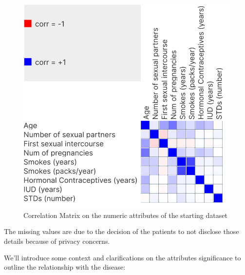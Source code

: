 \begin{figure}
    \centerline{
        \includegraphics[width=0.3\paperwidth]{figures/corr.png}}
    \caption{Correlation Matrix on the numeric attributes of the starting dataset}
    \label{correlation_matrix}
\end{figure}


The missing values are due to the decision of the patients to not disclose those details because of privacy concerns.

We'll introduce some context and clarifications on the attributes significance to outline the relationship with the disease:

